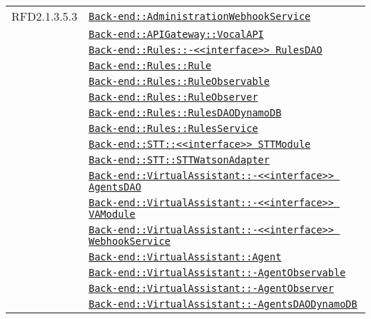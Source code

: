 \begin{longtable}{|>{\centering}m{3cm}|m{10cm}<{\centering}|}
RFD2.1.3.5.3 & \hyperref[Back-end::AdministrationWebhookService]{\texttt{Back-end::AdministrationWebhookService}}\\
& \hyperref[Back-end::APIGateway::VocalAPI]{\texttt{Back-end::APIGateway::VocalAPI}}\\
& \hyperref[Back-end::Rules::<<interface>> RulesDAO]{\texttt{Back-end::Rules::-\linebreak <<interface>> RulesDAO}}\\
& \hyperref[Back-end::Rules::Rule]{\texttt{Back-end::Rules::Rule}}\\
& \hyperref[Back-end::Rules::RuleObservable]{\texttt{Back-end::Rules::RuleObservable}}\\
& \hyperref[Back-end::Rules::RuleObserver]{\texttt{Back-end::Rules::RuleObserver}}\\
& \hyperref[Back-end::Rules::RulesDAODynamoDB]{\texttt{Back-end::Rules::RulesDAODynamoDB}}\\
& \hyperref[Back-end::Rules::RulesService]{\texttt{Back-end::Rules::RulesService}}\\
& \hyperref[Back-end::STT::<<interface>> STTModule]{\texttt{Back-end::STT::<<interface>> STTModule}}\\
& \hyperref[Back-end::STT::STTWatsonAdapter]{\texttt{Back-end::STT::STTWatsonAdapter}}\\
& \hyperref[Back-end::VirtualAssistant::<<interface>> AgentsDAO]{\texttt{Back-end::VirtualAssistant::-\linebreak <<interface>> AgentsDAO}}\\
& \hyperref[Back-end::VirtualAssistant::<<interface>> VAModule]{\texttt{Back-end::VirtualAssistant::-\linebreak <<interface>> VAModule}}\\
& \hyperref[Back-end::VirtualAssistant::<<interface>> WebhookService]{\texttt{Back-end::VirtualAssistant::-\linebreak <<interface>> WebhookService}}\\
& \hyperref[Back-end::VirtualAssistant::Agent]{\texttt{Back-end::VirtualAssistant::Agent}}\\
& \hyperref[Back-end::VirtualAssistant::AgentObservable]{\texttt{Back-end::VirtualAssistant::-\linebreak AgentObservable}}\\
& \hyperref[Back-end::VirtualAssistant::AgentObserver]{\texttt{Back-end::VirtualAssistant::-\linebreak AgentObserver}}\\
& \hyperref[Back-end::VirtualAssistant::AgentsDAODynamoDB]{\texttt{Back-end::VirtualAssistant::-\linebreak AgentsDAODynamoDB}}\\

\end{longtable}

